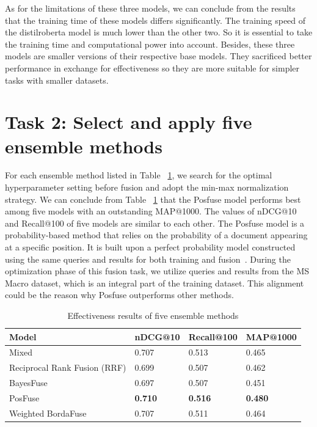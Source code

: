 \documentclass[acmsmall]{acmart}
\begin{document}
As for the limitations of these three models, we can conclude from the results that the training time of these models differs significantly. The training speed of the distilroberta model is much lower than the other two. So it is essential to take the training time and computational power into account. Besides, these three models are smaller versions of their respective base models. They sacrificed better performance in exchange for effectiveness so they are more suitable for simpler tasks with smaller datasets.

\section{Task 2: Select and apply five ensemble methods}
For each ensemble method listed in Table ~\ref{tab:results-task2}, we search for the optimal hyperparameter setting before fusion and adopt the min-max normalization strategy. We can conclude from Table ~\ref{tab:results-task2} that the Posfuse model performs best among five models with an outstanding MAP@1000. The values of nDCG@10 and Recall@100 of five models are similar to each other. The Posfuse model is a probability-based method that relies on the probability of a document appearing at a specific position. It is built upon a perfect probability model constructed using the same queries and results for both training and fusion~\cite{DBLP:conf/sigir/LillisZTCLD10}. During the optimization phase of this fusion task, we utilize queries and results from the MS Macro dataset, which is an integral part of the training dataset. This alignment could be the reason why Posfuse outperforms other methods.

\begin{table}[!ht]
    \centering
    \caption{Effectiveness results of five ensemble methods}
    \label{tab:results-task2}
    \begin{tabular}{llll}
       \toprule
       \textbf{Model} &  \textbf{nDCG@10} & \textbf{Recall@100} & \textbf{MAP@1000}\\
       \midrule
       Mixed & 0.707 & 0.513 & 0.465\\
       Reciprocal Rank Fusion (RRF) & 0.699 & 0.507 & 0.462\\
       BayesFuse & 0.697 & 0.507 & 0.451\\
       PosFuse & \textbf{0.710} & \textbf{0.516} & \textbf{0.480}\\
       Weighted BordaFuse & 0.707 & 0.511 & 0.464\\
       \bottomrule
    \end{tabular}
\end{table}
\end{document}
